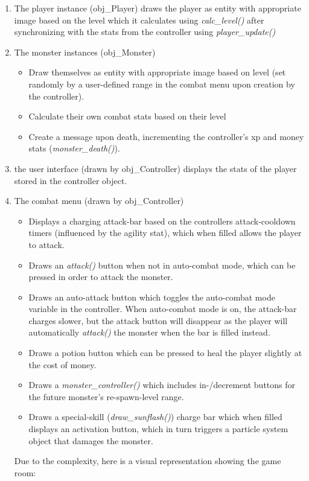 \documentclass[12pt]{report}
\begin{document}
\begin{enumerate}
\begin{enumerate}
\item The player instance (obj\_Player) draws the player as entity with appropriate image based on the level which it calculates using \textsl{calc\_level()} after synchronizing with the stats from the controller using \textsl{player\_update()}
\item The monster instances (obj\_Monster)
\begin{itemize}
\item Draw themselves as entity with appropriate image based on level (set randomly by a user-defined range in the combat menu upon creation by the controller).
\item Calculate their own combat stats based on their level
\item Create a message upon death, incrementing the controller's xp and money stats (\textsl{monster\_death()}).
\end{itemize}
\item the user interface (drawn by obj\_Controller) displays the stats of the player stored in the controller object.
\item The combat menu (drawn by obj\_Controller)
\begin{itemize}
\item Displays a charging attack-bar based on the controllers attack-cooldown timers (influenced by the agility stat), which when filled allows the player to attack.
\item Draws an \textsl{attack()} button when not in auto-combat mode, which can be pressed in order to attack the monster.
\item Draws an auto-attack button which toggles the auto-combat mode variable in the controller. When auto-combat mode is on, the attack-bar charges slower, but the attack button will disappear as the player will automatically \textsl{attack()} the monster when the bar is filled instead.
\item Draws a potion button which can be pressed to heal the player slightly at the cost of money.
\item Draws a \textsl{monster\_controller()} which includes in-/decrement buttons for the future monster's re-spawn-level range.
\item Draws a special-skill (\textsl{draw\_sunflash()}) charge bar which when filled displays an activation button, which in turn triggers a particle system object that damages the monster.
\end{itemize}
Due to the complexity, here is a visual representation showing the game room:


\end{enumerate}
\end{enumerate}
\end{document}
